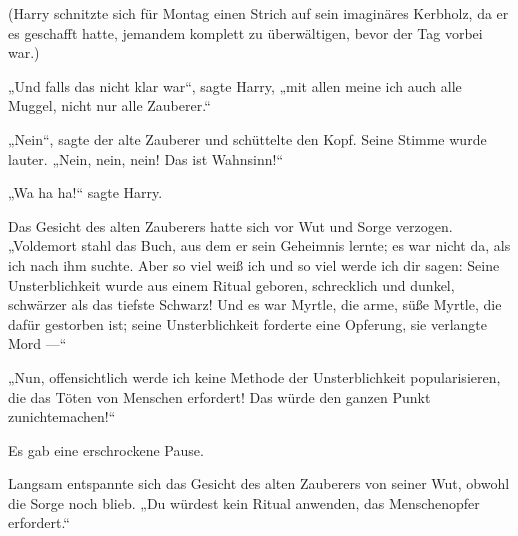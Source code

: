 (Harry schnitzte sich für Montag einen Strich auf sein imaginäres Kerbholz, da er es geschafft hatte, jemandem komplett zu überwältigen, bevor der Tag vorbei war.)

„Und falls das nicht klar war“, sagte Harry, „mit allen meine ich auch alle Muggel, nicht nur alle Zauberer.“

„Nein“, sagte der alte Zauberer und schüttelte den Kopf. Seine Stimme wurde lauter.
„Nein, nein, nein! Das ist Wahnsinn!“

„Wa ha ha!“ sagte Harry.

Das Gesicht des alten Zauberers hatte sich vor Wut und Sorge verzogen.
„Voldemort stahl das Buch, aus dem er sein Geheimnis lernte; es war nicht da, als ich nach ihm suchte. Aber so viel weiß ich und so viel werde ich dir sagen: Seine Unsterblichkeit wurde aus einem Ritual geboren, schrecklich und dunkel, schwärzer als das tiefste Schwarz! Und es war Myrtle, die arme, süße Myrtle, die dafür gestorben ist; seine Unsterblichkeit forderte eine Opferung, sie verlangte Mord —“

„Nun, offensichtlich werde ich keine Methode der Unsterblichkeit popularisieren, die das Töten von Menschen erfordert! Das würde den ganzen Punkt zunichtemachen!“

Es gab eine erschrockene Pause.

Langsam entspannte sich das Gesicht des alten Zauberers von seiner Wut, obwohl die Sorge noch blieb.
„Du würdest kein Ritual anwenden, das Menschenopfer erfordert.“

